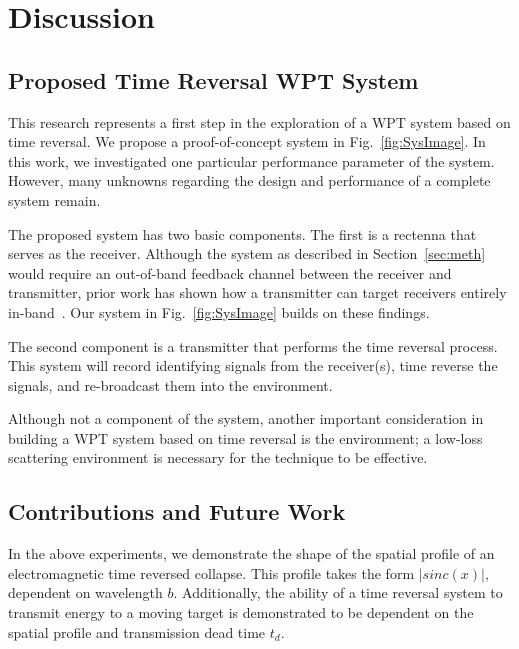 \section{Discussion}
\label{sec:discussion}

\subsection{Proposed Time Reversal WPT System}
\label{sec:system}

This research represents a first step in the exploration of a WPT system based on time reversal. We propose a proof-of-concept system in Fig.~\ref{fig:SysImage}. In this work, we investigated one particular performance parameter of the system. However, many unknowns regarding the design and performance of a complete system remain.

The proposed system has two basic components. The first is a rectenna that serves as the receiver. Although the system as described in Section~\ref{sec:meth} would require an out-of-band feedback channel between the receiver and transmitter, prior work has shown how a transmitter can target  receivers entirely in-band~\cite{nltr-wave-chaotic,roman}. Our system in Fig.~\ref{fig:SysImage} builds on these findings.

The second component is a transmitter that performs the time reversal process. This system will record identifying signals from the receiver(s), time reverse the signals, and re-broadcast them into the environment.

Although not a component of the system, another important consideration in building a WPT system based on time reversal is the environment; a low-loss scattering environment is necessary for the technique to be effective.

\subsection{Contributions and Future Work}
\label{sec:contrib}

In the above experiments, we demonstrate the shape of the spatial profile of an electromagnetic
time reversed collapse. This profile takes the form $\left|sinc(x)\right|$, dependent on wavelength $b$.
Additionally, the ability of a time reversal system to transmit energy to a moving target is
demonstrated to be dependent on the spatial profile and transmission dead
time $t_{d}$.

